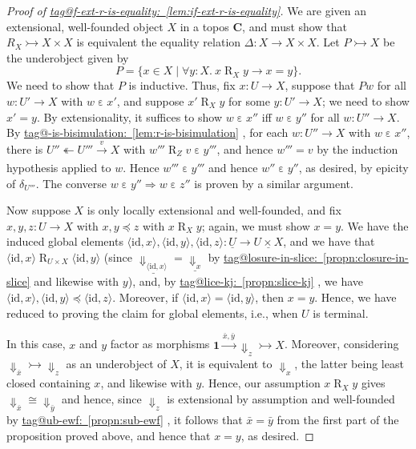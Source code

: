 \documentclass{amsart}
\makeatletter
\newcommand\bC{\mathbf{C}}
\newcommand\br[1]{\langle{}#1\rangle{}}
\newcommand\Dwn{{\Downarrow}}
\newcommand\ein{\mathrel{\varepsilon}}
\newcommand\id{\mathrm{id}}
\newcommand\oot{\twoheadleftarrow}
\newcommand\Rrel{\mathrel{R}}
\newcommand\set[2][]{#1\{ #2 #1\}}
\newcommand\tm{\mathbf{1}}
\newcommand\tox[2][]{\xrightarrow[#1]{#2}}
\newcommand\To{\Rightarrow}
\newcommand\tto{\rightarrowtail}
\newcommand\und[1]{\underline{#1}}
\newcommand\tagword[1]{\csname tag@#1\endcsname}
\def\label@tag#1:#2\@nil{#1}
\newcommand\labeltag[1]{\label@tag#1:\@nil}
\newcommand\jref[1]{%
  \texorpdfstring%
    {\hyperref[#1]{\tagword{\labeltag{#1}}~\ref*{#1}}}%
    {\tagword{\labeltag{#1}}~\ref*{#1}}%
}
\theoremstyle{definition}
\theoremstyle{remark}
\theoremstyle{plainwithref}
\makeatother
\begin{document}
\begin{proof}[Proof of \jref{lem:if-ext-r-is-equality}] \label{proof:if-ext-r-is-equality}
  We are given an extensional, well-founded object \( X \) in a topos \( \bC \), and must show that \( R_X \tto X \times X \) is equivalent the equality relation \( \Delta \colon X \to X \times X \).
  Let \( P \tto X \) be the underobject given by
  \[
    P = \set{ x \in X \mid \forall y \colon X.\ x \Rrel_X y \to x = y }.
  \]
  We need to show that \( P \) is inductive.
  Thus, fix \( x \colon U \to X \), suppose that \( P w \) for all \( w \colon U' \to X \) with \( w \ein x' \), and suppose \( x' \Rrel_X y \) for some \( y \colon U' \to X \); we need to show \( x' = y \).
  By extensionality, it suffices to show \( w \ein x'' \) iff \( w \ein y'' \) for all \( w \colon U'' \to X \).
  By \jref{lem:r-is-bisimulation}, for each \( w \colon U'' \to X \) with \( w \ein x'' \), there is \( U'' \oot U''' \tox{v} X \) with \( w''' \Rrel_Z v \ein y''' \), and hence \( w''' = v \) by the induction hypothesis applied to \( w \).
  Hence \( w''' \ein y''' \) and hence \( w'' \ein y'' \), as desired, by epicity of \( \delta_{U'''} \).
  The converse \( w \ein y'' \To w \ein z'' \) is proven by a similar argument.

  Now suppose \( X \) is only locally extensional and well-founded, and fix \( x,y,z \colon U \to X \) with \( x,y \preceq z \) with \( x \Rrel_X y \); again, we must show \( x = y \).
  We have the induced global elements \( \br{\id, x}, \br{\id, y}, \br{\id, z} \colon \und U \to \und{U \times X} \), and we have that \( \br{\id, x} \Rrel_{U \times X} \br{\id, y} \) (since \( \und{\Dwn_{\br{\id, x}}} = \und{\Dwn_{x}} \) by \jref{propn:closure-in-slice} and likewise with \( y \)), and, by \jref{propn:slice-kj}, we have \( \br{\id, x}, \br{\id, y} \preceq \br{\id, z} \).
  Moreover, if \( \br{\id, x} = \br{\id, y} \), then \( x = y \).
  Hence, we have reduced to proving the claim for global elements, i.e., when \( U \) is terminal.

  In this case, \( x \) and \( y \) factor as morphisms \( \tm \tox{\bar x, \bar y} \Dwn_z \tto X \).
  Moreover, considering \( \Dwn_{\bar x} \tto \Dwn_z \) as an underobject of \( X \), it is equivalent to \( \Dwn_x \), the latter being least closed containing \( x \), and likewise with \( y \).
  Hence, our assumption \( x \Rrel_X y \) gives \( \Dwn_{\bar x} \cong \Dwn_{\bar y} \) and hence, since \( \Dwn_z \) is extensional by assumption and well-founded by \jref{propn:sub-ewf}, it follows that \( \bar x = \bar y \) from the first part of the proposition proved above, and hence that \( x = y \), as desired.
\end{proof}
\end{document}
